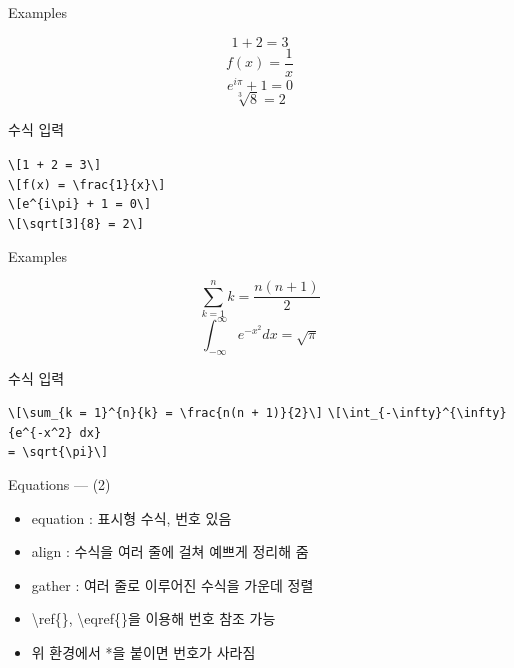 \documentclass[12pt]{gshs_lecture}
\newenvironment{codeblock}[1]{
	\begin{block}{#1}
		\setstretch{1.0}
		\begin{small}
}{
		\end{small}
	\end{block}
}
\begin{document}
\begin{frame}[t]{Examples}
	
	\[1 + 2 = 3\]
	\[f(x) = \frac{1}{x}\]
	\[e^{i\pi} + 1 = 0\]
	\[\sqrt[3]{8} = 2\]
	
	\begin{codeblock}{수식 입력}
		\texttt{\textbackslash[1 + 2 = 3\textbackslash]}\\
		\texttt{\textbackslash[f(x) = \textbackslash frac\{1\}\{x\}\textbackslash]}\\
		\texttt{\textbackslash[e\^{}\{i\textbackslash pi\} + 1 = 0\textbackslash]}\\
		\texttt{\textbackslash[\textbackslash sqrt[3]\{8\} = 2\textbackslash]}
	\end{codeblock}
\end{frame}

\begin{frame}[t]{Examples}
	
	\[\sum_{k=1}^{n}{k} = \frac{n(n+1)}{2}\]
	\[\int_{-\infty}^{\infty}{e^{-x^2} dx} = \sqrt{\pi}\]
	
	\begin{codeblock}{수식 입력}
		\texttt{\textbackslash[\textbackslash sum\_\{k = 1\}\^{}\{n\}\{k\} = \textbackslash frac\{n(n + 1)\}\{2\}\textbackslash]}
		\texttt{\textbackslash[\textbackslash int\_\{-\textbackslash infty\}\^{}\{\textbackslash infty\}\{e\^{}\{-x\^{}2\} dx\}\\= \textbackslash sqrt\{\textbackslash pi\}\textbackslash]}
	\end{codeblock}
	
\end{frame}

\begin{frame}[t]{Equations --- (2)}
	
	\begin{itemize}
		\item equation : 표시형 수식, 번호 있음
		\item align : 수식을 여러 줄에 걸쳐 예쁘게 정리해 줌
		\item gather : 여러 줄로 이루어진 수식을 가운데 정렬
		\vskip 1.5pc
		\item \textbackslash ref\{\}, \textbackslash eqref\{\}을 이용해 번호 참조 가능
		\item 위 환경에서 *을 붙이면 번호가 사라짐
	\end{itemize}
	
\end{frame}
\end{document}
